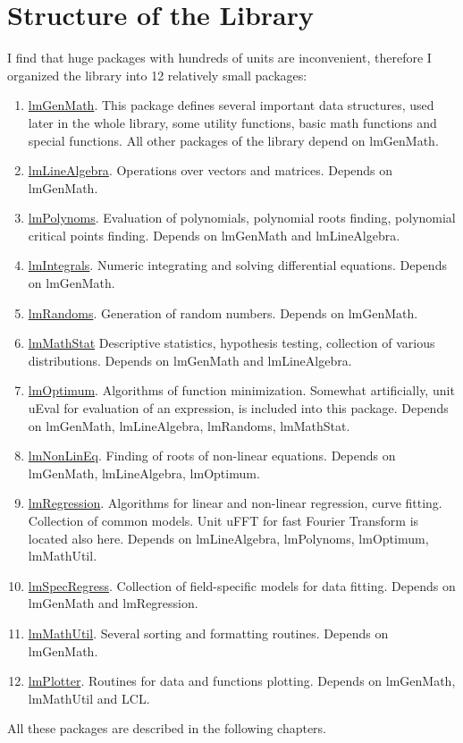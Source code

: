 \documentclass[12pt,a4paper,oneside]{report}
\begin{document}
\chapter{Structure of the Library}
I find that huge packages with hundreds of units are inconvenient, therefore I organized the library into 12 relatively small packages:
\begin{enumerate}
	\item{\hyperref[package-lmGenMath]{lmGenMath}.} This package defines several important data structures, used later in the whole library, some utility functions, basic math functions and special functions. All other packages of the library depend on lmGenMath.
	\item{\hyperref[package-lmLineAlgebra]{lmLineAlgebra}.} Operations over vectors and matrices. Depends on lmGenMath.
	\item{\hyperref[package-lmPolynoms]{lmPolynoms}.} Evaluation of polynomials, polynomial roots finding, polynomial critical points finding. Depends on lmGenMath and lmLineAlgebra.
	\item{\hyperref[package-lmIntegrals]{lmIntegrals}.} Numeric integrating and solving differential equations. Depends on lmGenMath.
	\item{\hyperref[package-lmRandoms]{lmRandoms}.} Generation of random numbers. Depends on lmGenMath.
	\item{\hyperref[package-lmMathStat]{lmMathStat}} Descriptive statistics, hypothesis testing, collection of various distributions. Depends on lmGenMath and lmLineAlgebra.
	\item{\hyperref[package-lmOptimum]{lmOptimum}.} Algorithms of function minimization. Somewhat artificially, unit uEval for evaluation of an expression, is included into this package. Depends on lmGenMath, lmLineAlgebra, lmRandoms, lmMathStat.
	\item{\hyperref[package-lmNonLinEq]{lmNonLinEq}.} Finding of roots of non-linear equations. Depends on lmGenMath, lmLineAlgebra, lmOptimum.
	\item{\hyperref[package-lmRegression]{lmRegression}.} Algorithms for linear and non-linear regression, curve fitting. Collection of common models. Unit uFFT for fast Fourier Transform is located also here.  Depends on lmLineAlgebra, lmPolynoms, lmOptimum, lmMathUtil.
	\item{\hyperref[package-lmSpecRegress]{lmSpecRegress}.} Collection of field-specific models for data fitting. Depends on lmGenMath and lmRegression.
	\item{\hyperref[package-lmMathUtil]{lmMathUtil}.} Several sorting and formatting routines. Depends on lmGenMath.
	\item{\hyperref[package-lmPlotter]{lmPlotter}.} Routines for data and functions plotting. Depends on lmGenMath, lmMathUtil and LCL.
\end{enumerate}	
All these packages are described in the following chapters. 
\pagestyle{fancy}
\fancyhead{}
\fancyhead[RO]{\rightmark}
\fancyhead[LO]{\leftmark}
\end{document}
